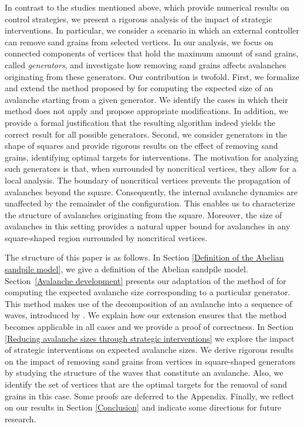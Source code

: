 \documentclass{article}
\begin{document}
In contrast to the studies mentioned above, which provide numerical results on control strategies, we present a rigorous analysis of the impact of strategic interventions. In particular, we consider a scenario in which an external controller can remove sand grains from selected vertices. In our analysis, we focus on connected components of vertices that hold the maximum amount of sand grains, called \textit{generators}, and investigate how removing sand grains affects avalanches originating from these generators. Our contribution is twofold. First, we formalize and extend the method proposed by \citet{Dorso} for computing the expected size of an avalanche starting from a given generator. We identify the cases in which their method does not apply and propose appropriate modifications. In addition, we provide a formal justification that the resulting algorithm indeed yields the correct result for all possible generators. Second, we consider generators in the shape of squares and provide rigorous results on the effect of removing sand grains, identifying optimal targets for interventions. The motivation for analyzing such generators is that, when surrounded by noncritical vertices, they allow for a local analysis. The boundary of noncritical vertices prevents the propagation of avalanches beyond the square. Consequently, the internal avalanche dynamics are unaffected by the remainder of the configuration. This enables us to characterize the structure of avalanches originating from the square. Moreover, the size of avalanches in this setting provides a natural upper bound for avalanches in any square-shaped region surrounded by noncritical vertices.%

The structure of this paper is as follows. In Section \ref{Definition of the Abelian sandpile model}, we give a definition of the Abelian sandpile model. Section~\ref{Avalanche development} presents our adaptation of the method of \citet{Dorso} for computing the expected avalanche size corresponding to a particular generator. This method makes use of the decomposition of an avalanche into a sequence of waves, introduced by \citet{Ivashkevich}. We explain how our extension ensures that the method becomes applicable in all cases and we provide a proof of correctness. In Section \ref{Reducing avalanche sizes through strategic interventions} we explore the impact of strategic interventions on expected avalanche sizes. We derive rigorous results on the impact of removing sand grains from vertices in square-shaped generators by studying the structure of the waves that constitute an avalanche. Also, we identify the set of vertices that are the optimal targets for the removal of sand grains in this case. Some proofs are deferred to the Appendix. %
Finally, we reflect on our results in Section \ref{Conclusion} and indicate some directions for future research. 
\end{document}

